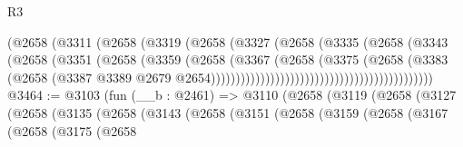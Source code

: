 \begin{lexlean}{R3}
\begin{coremodule}
                                                  (@2658
                                                    (@3311
                                                      (@2658
                                                        (@3319
                                                          (@2658
                                                            (@3327
                                                              (@2658
                                                                (@3335
                                                                  (@2658
                                                                    (@3343
                                                                      (@2658
                                                                        (@3351
                                                                          (@2658
                                                                            (@3359
                                                                              (@2658
                                                                                (@3367
                                                                                  (@2658
                                                                                    (@3375
                                                                                      (@2658
                                                                                        (@3383
                                                                                          (@2658
                                                                                            (@3387
                                                                                              @3389
                                                                                              @2679
                                                                                              @2654)))))))))))))))))))))))))))))))))))))))))))))
@3464 := @3103
    (fun (__b : @2461) =>
    @3110
      (@2658
        (@3119
          (@2658
            (@3127
              (@2658
                (@3135
                  (@2658
                    (@3143
                      (@2658
                        (@3151
                          (@2658
                            (@3159
                              (@2658
                                (@3167
                                  (@2658
                                    (@3175
                                      (@2658

\end{coremodule}
\end{lexlean}
